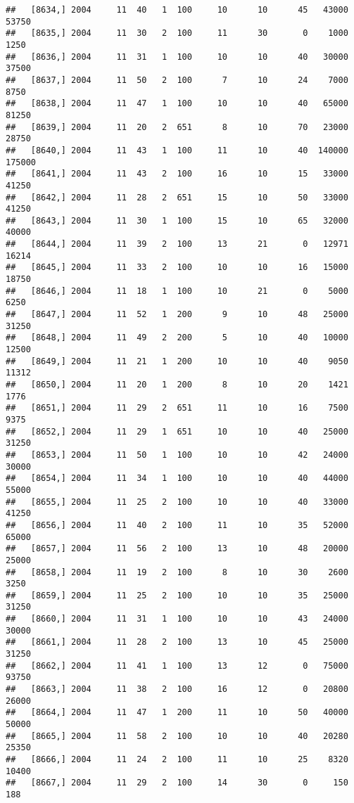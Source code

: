 \documentclass{article}\usepackage[]{graphicx}\usepackage[]{color}
\makeatletter
\newenvironment{kframe}{%
 \def\at@end@of@kframe{}%
 \ifinner\ifhmode%
  \def\at@end@of@kframe{\end{minipage}}%
  \begin{minipage}{\columnwidth}%
 \fi\fi%
 \def\FrameCommand##1{\hskip\@totalleftmargin \hskip-\fboxsep
 \colorbox{shadecolor}{##1}\hskip-\fboxsep
     \hskip-\linewidth \hskip-\@totalleftmargin \hskip\columnwidth}%
 \MakeFramed {\advance\hsize-\width
   \@totalleftmargin\z@ \linewidth\hsize
   \@setminipage}}%
 {\par\unskip\endMakeFramed%
 \at@end@of@kframe}
\newenvironment{knitrout}{}{} %
\makeatother
\begin{document}
\begin{knitrout}
\begin{kframe}
\begin{verbatim}
##   [8634,] 2004     11  40   1  100     10      10      45   43000   53750
##   [8635,] 2004     11  30   2  100     11      30       0    1000    1250
##   [8636,] 2004     11  31   1  100     10      10      40   30000   37500
##   [8637,] 2004     11  50   2  100      7      10      24    7000    8750
##   [8638,] 2004     11  47   1  100     10      10      40   65000   81250
##   [8639,] 2004     11  20   2  651      8      10      70   23000   28750
##   [8640,] 2004     11  43   1  100     11      10      40  140000  175000
##   [8641,] 2004     11  43   2  100     16      10      15   33000   41250
##   [8642,] 2004     11  28   2  651     15      10      50   33000   41250
##   [8643,] 2004     11  30   1  100     15      10      65   32000   40000
##   [8644,] 2004     11  39   2  100     13      21       0   12971   16214
##   [8645,] 2004     11  33   2  100     10      10      16   15000   18750
##   [8646,] 2004     11  18   1  100     10      21       0    5000    6250
##   [8647,] 2004     11  52   1  200      9      10      48   25000   31250
##   [8648,] 2004     11  49   2  200      5      10      40   10000   12500
##   [8649,] 2004     11  21   1  200     10      10      40    9050   11312
##   [8650,] 2004     11  20   1  200      8      10      20    1421    1776
##   [8651,] 2004     11  29   2  651     11      10      16    7500    9375
##   [8652,] 2004     11  29   1  651     10      10      40   25000   31250
##   [8653,] 2004     11  50   1  100     10      10      42   24000   30000
##   [8654,] 2004     11  34   1  100     10      10      40   44000   55000
##   [8655,] 2004     11  25   2  100     10      10      40   33000   41250
##   [8656,] 2004     11  40   2  100     11      10      35   52000   65000
##   [8657,] 2004     11  56   2  100     13      10      48   20000   25000
##   [8658,] 2004     11  19   2  100      8      10      30    2600    3250
##   [8659,] 2004     11  25   2  100     10      10      35   25000   31250
##   [8660,] 2004     11  31   1  100     10      10      43   24000   30000
##   [8661,] 2004     11  28   2  100     13      10      45   25000   31250
##   [8662,] 2004     11  41   1  100     13      12       0   75000   93750
##   [8663,] 2004     11  38   2  100     16      12       0   20800   26000
##   [8664,] 2004     11  47   1  200     11      10      50   40000   50000
##   [8665,] 2004     11  58   2  100     10      10      40   20280   25350
##   [8666,] 2004     11  24   2  100     11      10      25    8320   10400
##   [8667,] 2004     11  29   2  100     14      30       0     150     188

\end{verbatim}
\end{kframe}
\end{knitrout}
\end{document}
